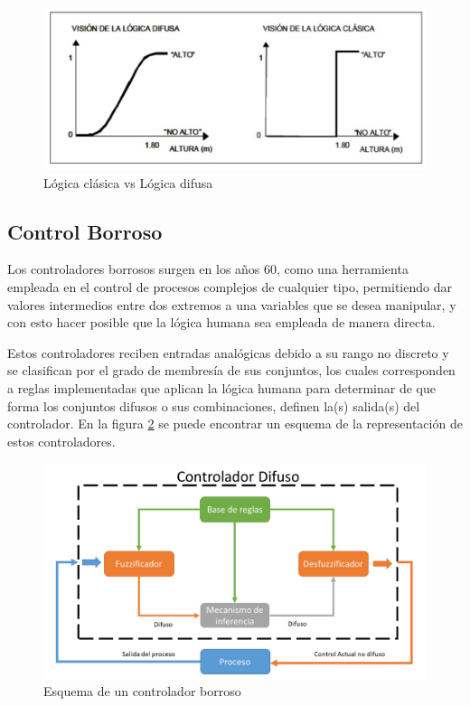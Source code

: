 \begin{figure}[!h]
	\centering
		\includegraphics[scale=0.7]{Imagenes/hombres}
		\caption{Lógica clásica vs Lógica difusa \cite{fuzzy}}
		\label{fig:hombres}
	\end{figure}	

\subsection{Control Borroso}

Los controladores borrosos surgen en los años 60, como una herramienta empleada en el control de procesos complejos de cualquier tipo, permitiendo dar valores intermedios entre dos extremos a una variables que se desea manipular, y con esto hacer posible que la lógica humana sea empleada de manera directa.\\

\par Estos controladores reciben entradas analógicas debido a su rango no discreto y se clasifican por el grado de membresía de sus conjuntos, los cuales corresponden a reglas implementadas que aplican la lógica humana para determinar de que forma los conjuntos difusos o sus combinaciones, definen la(s) salida(s) del controlador. En la figura \ref{fig:fuzzy} se puede encontrar un esquema de la representación de estos controladores.\\ 

\begin{figure}[H]
	\centering
		\includegraphics[scale=0.5]{Imagenes/fuzzy}
		\caption{Esquema de un controlador borroso}
		\label{fig:fuzzy}
	\end{figure}	


